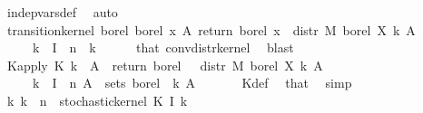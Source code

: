 \begin{isabellebody}
\ indep{\isacharunderscore}{\kern0pt}vars{\isacharunderscore}{\kern0pt}def\ \isamarkupfalse%
\ auto\isanewline
\ \ \isamarkupfalse%
\ \isamarkupfalse%
\ {\isachardoublequoteopen}transition{\isacharunderscore}{\kern0pt}kernel\ borel\ borel\ {\isacharparenleft}{\kern0pt}{\isasymlambda}x\ A{\isacharprime}{\kern0pt}{\isachardot}{\kern0pt}\ {\isacharparenleft}{\kern0pt}{\isacharparenleft}{\kern0pt}return\ borel\ x{\isacharparenright}{\kern0pt}\ {\isasymstar}\ {\isacharparenleft}{\kern0pt}distr\ M\ borel\ {\isacharparenleft}{\kern0pt}X\ k{\isacharparenright}{\kern0pt}{\isacharparenright}{\kern0pt}{\isacharparenright}{\kern0pt}\ A{\isacharprime}{\kern0pt}{\isacharparenright}{\kern0pt}{\isachardoublequoteclose}\isanewline
\ \ \ \ \ {\isachardoublequoteopen}k\ {\isasymin}\ I\ {\isacharbackquote}{\kern0pt}\ {\isacharbraceleft}{\kern0pt}{}{\isachardot}{\kern0pt}{\isachardot}{\kern0pt}n{\isacharbraceright}{\kern0pt}{\isachardoublequoteclose}\ \ k\isanewline
\ \ \ \ \isamarkupfalse%
\ that\ conv{\isacharunderscore}{\kern0pt}distr{\isacharunderscore}{\kern0pt}kernel\ \isamarkupfalse%
\ blast\isanewline
\ \ \isamarkupfalse%
\ \isamarkupfalse%
\ K{\isacharunderscore}{\kern0pt}apply{\isacharcolon}{\kern0pt}\ {\isachardoublequoteopen}K\ k\ {\isasymomega}\ A{\isacharprime}{\kern0pt}\ {\isacharequal}{\kern0pt}\ {\isacharparenleft}{\kern0pt}{\isacharparenleft}{\kern0pt}return\ borel\ {\isasymomega}{\isacharparenright}{\kern0pt}\ {\isasymstar}\ {\isacharparenleft}{\kern0pt}distr\ M\ borel\ {\isacharparenleft}{\kern0pt}X\ k{\isacharparenright}{\kern0pt}{\isacharparenright}{\kern0pt}{\isacharparenright}{\kern0pt}\ A{\isacharprime}{\kern0pt}{\isachardoublequoteclose}\isanewline
\ \ \ \ \ {\isachardoublequoteopen}k\ {\isasymin}\ I\ {\isacharbackquote}{\kern0pt}\ {\isacharbraceleft}{\kern0pt}{}{\isachardot}{\kern0pt}{\isachardot}{\kern0pt}n{\isacharbraceright}{\kern0pt}{\isachardoublequoteclose}\ {\isachardoublequoteopen}A{\isacharprime}{\kern0pt}\ {\isasymin}\ sets\ borel{\isachardoublequoteclose}\ \ k\ A{\isacharprime}{\kern0pt}\ {\isasymomega}\isanewline
\ \ \ \ \isamarkupfalse%
\ K{\isacharunderscore}{\kern0pt}def\ \isamarkupfalse%
\ that\ \isamarkupfalse%
\ simp\isanewline
\ \ \isamarkupfalse%
\ {\isachardoublequoteopen}{\isasymAnd}k{\isachardot}{\kern0pt}\ k\ {\isasymin}\ {\isacharbraceleft}{\kern0pt}{}{\isachardot}{\kern0pt}{\isachardot}{\kern0pt}n{\isacharbraceright}{\kern0pt}\ {\isasymLongrightarrow}\ stochastic{\isacharunderscore}{\kern0pt}kernel\ {\isacharparenleft}{\kern0pt}K\ {\isacharparenleft}{\kern0pt}I\ k{\isacharparenright}{\kern0pt}{\isacharparenright}{\kern0pt}{\isachardoublequoteclose}\isanewline

\end{isabellebody}
